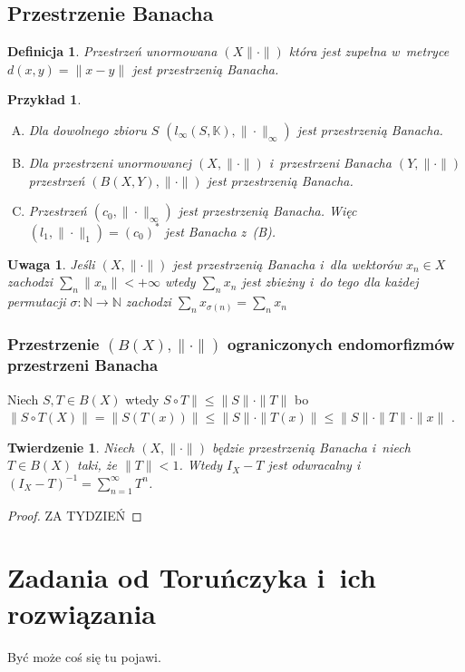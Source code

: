 \documentclass[11pt]{mwrep}
\renewcommand{\[}{\begin{equation}}
\renewcommand{\]}{\end{equation}}
\newcommand{\N}{{\ensuremath{\mathbb N}}}
\newcommand{\K}{\ensuremath{\mathbb{K}}}
\newcommand{\norm}{\|\cdot\|}
\newtheorem{twr}[subsection]{Twierdzenie}%
\newtheorem{uw}[subsection]{Uwaga}
\newtheorem{de}[subsection]{Definicja}
\newtheorem{ex}[subsection]{Przykład}
\newcounter{numer}
\begin{document}
\section{Przestrzenie Banacha}
\begin{de}
	Przestrzeń unormowana $(X\norm )$ która jest zupełna w~metryce $d(x,y) = \|x- y\|$ jest przestrzenią Banacha.
\end{de}
\begin{ex}
	\begin{enumerate}[(A)]
		\item Dla dowolnego zbioru $S$ $\left( l_\infty(S,\K),\norm_\infty \right)$ jest przestrzenią Banacha. 
		\item Dla przestrzeni unormowanej  $(X,\norm)$ i~przestrzeni Banacha $(Y,\norm)$ przestrzeń $\left( B(X,Y), \norm \right)$ 
			jest przestrzenią Banacha.
		\item Przestrzeń $(c_0, \norm_\infty)$ jest przestrzenią Banacha. Więc $(l_1,\norm_1)= (c_0)^*$ jest Banacha  z~(B).
	\end{enumerate}
\end{ex}
\begin{uw}
	Jeśli $(X,\norm)$ jest przestrzenią Banacha i~dla wektorów $x_n \in X$ zachodzi $\sum_n \|x_n\| < +\infty$ wtedy 
	$\sum_n x_n$ jest zbieżny i~do tego dla każdej permutacji $\sigma\colon \N\to\N$ zachodzi $\sum_n x_{\sigma(n)} = \sum_n x_n$
\end{uw}
\subsection{Przestrzenie $(B(X),\norm)$ ograniczonych endomorfizmów przestrzeni Banacha}
Niech $S,T \in B(X)$ wtedy $S\circ T\| \le \|S\| \cdot \|T\|$ bo 
$\|S\circ T (X) \|= \| S(T(x))\| \le \|S\|\cdot \|T(x)\| \le \|S\| \cdot \|T\| \cdot \|x\|$ .

\begin{twr}
	Niech $(X,\norm)$ będzie przestrzenią Banacha i~niech $T\in B(X)$ taki, że $\|T\| <1$. Wtedy $I_X - T$ jest odwracalny i~
	$\left( I_X - T  \right)^{-1} = \sum_{n=1}^\infty T^n$.
\end{twr}
\begin{proof}
	ZA TYDZIEŃ
\end{proof}
\chapter{Zadania od Toruńczyka i~ich rozwiązania}
Być może coś się tu pojawi.
\end{document}
